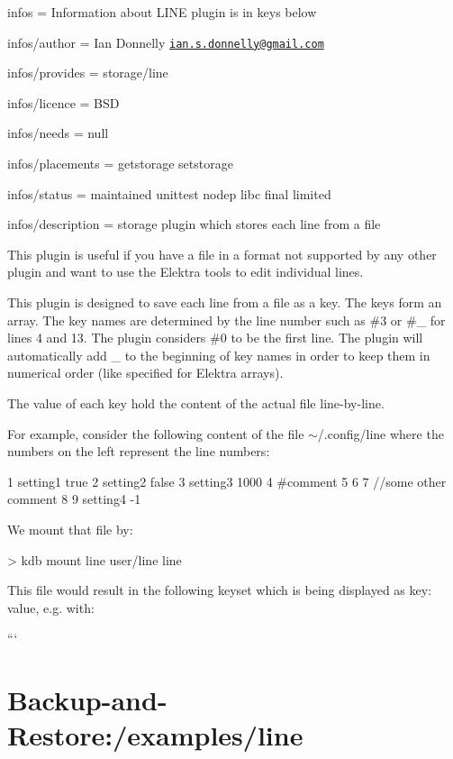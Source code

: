 
\begin{DoxyItemize}
\item infos = Information about L\+I\+N\+E plugin is in keys below
\item infos/author = Ian Donnelly \href{mailto:ian.s.donnelly@gmail.com}{\tt ian.\+s.\+donnelly@gmail.\+com}
\item infos/provides = storage/line
\item infos/licence = B\+S\+D
\item infos/needs = null
\item infos/placements = getstorage setstorage
\item infos/status = maintained unittest nodep libc final limited
\item infos/description = storage plugin which stores each line from a file
\end{DoxyItemize}

This plugin is useful if you have a file in a format not supported by any other plugin and want to use the Elektra tools to edit individual lines.

This plugin is designed to save each line from a file as a key. The keys form an array. The key names are determined by the line number such as {\ttfamily \#3} or {\ttfamily \#\+\_} for lines 4 and 13. The plugin considers {\ttfamily \#0} to be the first line. The plugin will automatically add {\ttfamily \+\_\+} to the beginning of key names in order to keep them in numerical order (like specified for Elektra arrays).

The value of each key hold the content of the actual file line-\/by-\/line.

For example, consider the following content of the file {\ttfamily $\sim$/.config/line} where the numbers on the left represent the line numbers\+: \begin{DoxyVerb}1  setting1 true
2  setting2 false
3  setting3 1000
4  #comment
5
6
7  //some other comment
8
9  setting4 -1
\end{DoxyVerb}


We mount that file by\+: \begin{DoxyVerb}> kdb mount line user/line line
\end{DoxyVerb}


This file would result in the following keyset which is being displayed as {\ttfamily key\+: value}, e.\+g. with\+: 
 ``` \section*{Backup-\/and-\/\+Restore\+:/examples/line}

